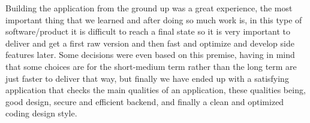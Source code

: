 Building the application from the ground up was a great experience, the most important thing that we learned and after doing so much work is, in this type of software/product it is difficult  to reach a final state so it is very important to deliver and get a first raw version and then fast and optimize and develop side features later. Some decisions were even based on this premise, having in mind that some choices are for the short-medium term rather than the long term are just faster to deliver that way, but finally we have ended up with a satisfying application that checks the main qualities of an application, these qualities being, good design, secure and efficient backend, and finally a clean and optimized coding design style.







